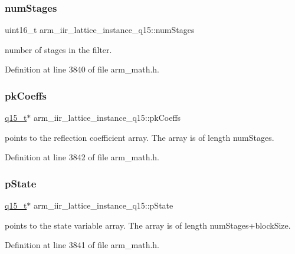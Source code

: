 \subsubsection{\texorpdfstring{num\+Stages}{numStages}}
{\footnotesize\ttfamily uint16\+\_\+t arm\+\_\+iir\+\_\+lattice\+\_\+instance\+\_\+q15\+::num\+Stages}

number of stages in the filter. 

Definition at line 3840 of file arm\+\_\+math.\+h.

\mbox{\label{structarm__iir__lattice__instance__q15_a41c214a1ec38d4a82fae8899d715dd29}} 
\subsubsection{\texorpdfstring{pk\+Coeffs}{pkCoeffs}}
{\footnotesize\ttfamily \hyperlink{arm__math_8h_ab5a8fb21a5b3b983d5f54f31614052ea}{q15\+\_\+t}$\ast$ arm\+\_\+iir\+\_\+lattice\+\_\+instance\+\_\+q15\+::pk\+Coeffs}

points to the reflection coefficient array. The array is of length num\+Stages. 

Definition at line 3842 of file arm\+\_\+math.\+h.

\mbox{\label{structarm__iir__lattice__instance__q15_afd0136ab917b529554d93f41a5e04618}} 
\subsubsection{\texorpdfstring{p\+State}{pState}}
{\footnotesize\ttfamily \hyperlink{arm__math_8h_ab5a8fb21a5b3b983d5f54f31614052ea}{q15\+\_\+t}$\ast$ arm\+\_\+iir\+\_\+lattice\+\_\+instance\+\_\+q15\+::p\+State}

points to the state variable array. The array is of length num\+Stages+block\+Size. 

Definition at line 3841 of file arm\+\_\+math.\+h.

